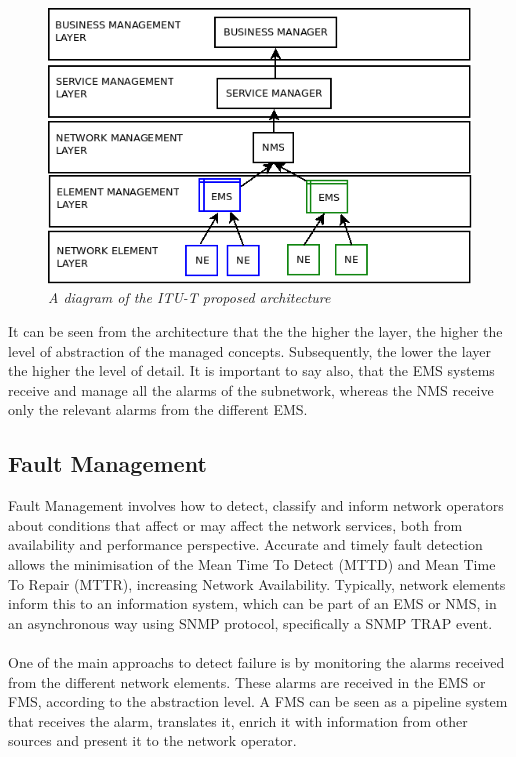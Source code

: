 \documentclass[10pt,a4paper]{article}
\begin{document}
 \begin{figure}[H]
 \includegraphics[scale=0.5]{ITU-Layered.png}
  \centering
  \caption{\textit{A diagram of the ITU-T proposed architecture}}
  \label{fig:ITULayerArchitecture}
\end{figure}	

It can be seen from the architecture that the the higher the layer, the higher the level of abstraction of the managed concepts. Subsequently, the lower the layer the higher the level of detail. It is important to say also, that the EMS systems receive and manage all the alarms of the subnetwork, whereas the NMS receive only the relevant alarms from the different EMS.

 \subsection{Fault Management}
 Fault Management involves how to detect, classify and inform network operators about conditions that affect or may affect the network services, both from availability and performance perspective. Accurate and timely fault detection allows the minimisation of the Mean Time To Detect (MTTD) and Mean Time To Repair (MTTR), increasing Network Availability. Typically, network elements inform this to an  information system, which can be part of an EMS or NMS, in an asynchronous way using SNMP protocol, specifically a SNMP TRAP event\cite{snmp}.
\\\\
One of the main approachs to detect failure is by monitoring the alarms received from the different network elements. These alarms are received in the EMS or FMS, according to the abstraction level. A FMS can be seen as a pipeline system that receives the alarm, translates it, enrich it with information from other sources and present it to the network operator.
\end{document}
